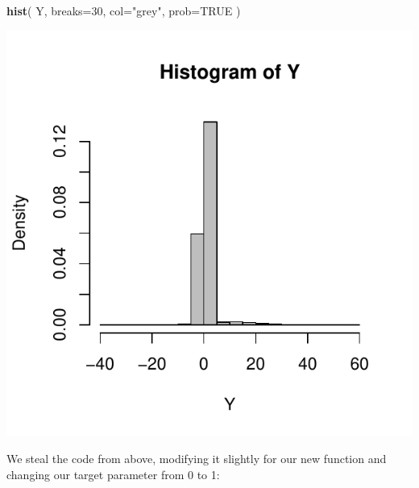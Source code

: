 \documentclass[
]{book}
\newenvironment{Shaded}{\begin{snugshade}}{\end{snugshade}}
\newcommand{\AttributeTok}[1]{\textcolor[rgb]{0.13,0.29,0.53}{#1}}
\newcommand{\ConstantTok}[1]{\textcolor[rgb]{0.56,0.35,0.01}{#1}}
\newcommand{\DecValTok}[1]{\textcolor[rgb]{0.00,0.00,0.81}{#1}}
\newcommand{\FunctionTok}[1]{\textcolor[rgb]{0.13,0.29,0.53}{\textbf{#1}}}
\newcommand{\NormalTok}[1]{#1}
\newcommand{\StringTok}[1]{\textcolor[rgb]{0.31,0.60,0.02}{#1}}
\begin{document}
\begin{Shaded}
\begin{Highlighting}[]
\FunctionTok{hist}\NormalTok{( Y, }\AttributeTok{breaks=}\DecValTok{30}\NormalTok{, }\AttributeTok{col=}\StringTok{"grey"}\NormalTok{, }\AttributeTok{prob=}\ConstantTok{TRUE}\NormalTok{ )}
\end{Highlighting}
\end{Shaded}

\begin{center}\includegraphics[width=0.75\linewidth]{Designing-Simulations-in-R_files/figure-latex/unnamed-chunk-188-1} \end{center}

We steal the code from above, modifying it slightly for our new function and
changing our target parameter from 0 to 1:
\end{document}
